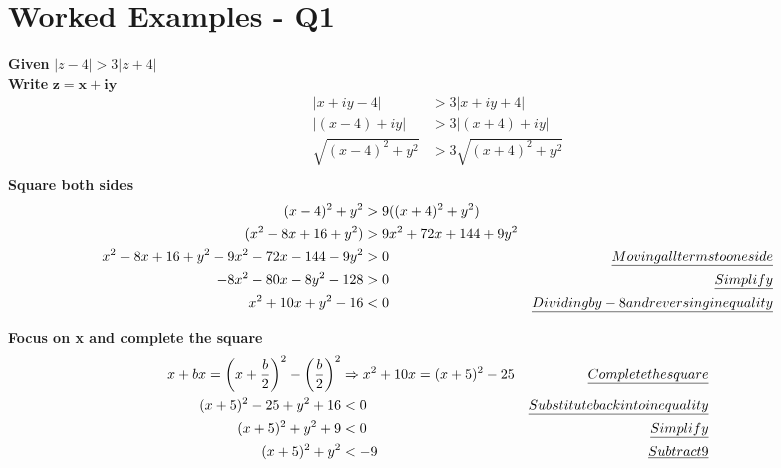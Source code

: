 \documentclass[a4paper, 8pt]{extarticle}
\begin{document}
\pagebreak

\section{Worked Examples - Q1}

\begin{examplebox}[2023 Q1(a)]
	\label{sol:2023Q1a}

	\textbf{Given} $|z - 4| > 3|z+4|$ \\
	\textbf{Write} $\boldsymbol{z = x + iy}$
	\begin{align*}
		| x + iy -4|         & > 3 |x + iy + 4|         \\
		| (x - 4) + iy|      & > 3 |(x + 4) + iy|       \\
		\sqrt{(x-4)^2 + y^2} & > 3 \sqrt{(x+4)^2 + y^2} \\
	\end{align*}
	\textbf{Square both sides}
	\begin{align*}
		(x-4)^2 + y^2                                 & > 9((x+4)^2 + y^2)                                                         \\
		(x^2 - 8x + 16 + y^2)                         & > 9x^2 + 72x + 144 + 9y^2                                                  \\
		x^2 - 8x + 16 + y^2 - 9x^2 - 72x - 144 - 9y^2 & > 0                       & \emph{Moving all terms to one side}            \\
		-8x^2 - 80x - 8y^2 - 128                      & > 0                       & \emph{Simplify }                               \\
		x^2 + 10x + y^2 - 16                          & < 0                       & \emph{Dividing by -8 and reversing inequality} \\
	\end{align*}

	\textbf{Focus on x and complete the square}
	\begin{align*}
		x + bx                   = \left(x + \frac{b}{2}\right)^2 - \left(\frac{b}{2}\right)^2 & \Rightarrow  x^2 + 10x = (x + 5)^2 - 25 & \emph{Complete the square}             \\
		(x+5)^2 - 25 + y^2 + 16                                                                & < 0                                     & \emph{Substitute back into inequality} \\
		(x+5)^2 + y^2 + 9                                                                      & < 0                                     & \emph{Simplify}                        \\
		(x+5)^2 + y^2                                                                          & < -9                                    & \emph{Subtract 9}                      \\
	\end{align*}


\end{examplebox}
\end{document}
